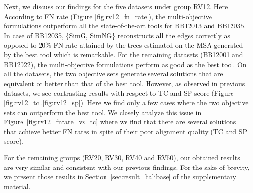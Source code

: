 Next, we discuss our findings for the five datasets under group RV12. Here According to FN rate (Figure \ref{fig:rv12_fn_rate}), the multi-objective formulations outperform all the state-of-the-art tools for BB12013 and BB12035. In case of BB12035, \{SimG, SimNG\} reconstructs all the edges correctly as opposed to 20\% FN rate attained by the trees estimated on the MSA generated by the best tool which is remarkable.
For the remaining datasets (BB12001 and BB12022), the multi-objective formulations perform as good as the best tool. On all the datasets, the two objective sets generate several solutions that are equivalent or better than that of the best tool.
However, as observed in previous datasets, we see contrasting results with respect to TC and SP score (Figure \ref{fig:rv12_tc},\ref{fig:rv12_sp}). Here we find only a few cases where the two objective sets can outperform the best tool. We closely analyze this issue in Figure~\ref{fig:rv12_fnrate_vs_tc} where we find that there are several solutions that achieve better FN rates in spite of their poor alignment quality (TC and SP score).


For the remaining groups (RV20, RV30, RV40 and RV50), our obtained results are very similar and consistent with our previous findings. For the sake of brevity, we present those results in Section~\ref{sec:result_balibase} of the supplementary material.


